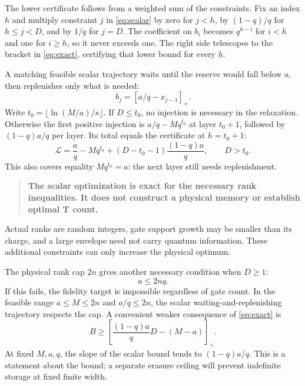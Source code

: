 \documentclass[11pt,a4paper]{article}
\numberwithin{equation}{section}
\theoremstyle{remark}\newtheorem*{remark}{Interpretation}
\newcommand{\positive}[1]{\left[#1\right]_+}
\newcommand{\keypoint}[1]{\begin{quote}\color{ink}\textbf{#1}\end{quote}}
\begin{document}
The lower certificate follows from a weighted sum of the constraints. Fix an index $h$ and multiply constraint $j$ in \eqref{eq:scalar} by zero for $j<h$, by $(1-q)/q$ for $h\le j<D$, and by $1/q$ for $j=D$. The coefficient on $b_i$ becomes $q^{h-i}$ for $i<h$ and one for $i\ge h$, so it never exceeds one. The right side telescopes to the bracket in \eqref{eq:exact}, certifying that lower bound for every $h$.

A matching feasible scalar trajectory waits until the reserve would fall below $a$, then replenishes only what is needed:
\begin{equation}
b_j=\positive{a/q-x_{j-1}}.
\end{equation}
Write $t_0=\lfloor\ln(M/a)/\kappa\rfloor$. If $D\le t_0$, no injection is necessary in the relaxation. Otherwise the first positive injection is $a/q-Mq^{t_0}$ at layer $t_0+1$, followed by $(1-q)a/q$ per layer. Its total equals the certificate at $h=t_0+1$:
\begin{equation}
\mathcal L=\frac aq-Mq^{t_0}
+(D-t_0-1)\frac{(1-q)a}{q},\qquad D>t_0.
\end{equation}
This also covers equality $Mq^{t_0}=a$: the next layer still needs replenishment.

\keypoint{The scalar optimization is exact for the necessary rank inequalities. It does not construct a physical memory or establish optimal T count.}
Actual ranks are random integers, gate support growth may be smaller than its charge, and a large envelope need not carry quantum information. These additional constraints can only increase the physical optimum.

The physical rank cap $2n$ gives another necessary condition when $D\ge1$:
\begin{equation}
a\le2nq.
\end{equation}
If this fails, the fidelity target is impossible regardless of gate count. In the feasible range $a\le M\le2n$ and $a/q\le2n$, the scalar waiting-and-replenishing trajectory respects the cap. A convenient weaker consequence of \eqref{eq:exact} is
\begin{equation}
B\ge\positive{\frac{(1-q)a}{q}D-(M-a)}.
\end{equation}
At fixed $M,a,q$, the slope of the scalar bound tends to $(1-q)a/q$. This is a statement about the bound; a separate erasure ceiling will prevent indefinite storage at fixed finite width.
\end{document}
